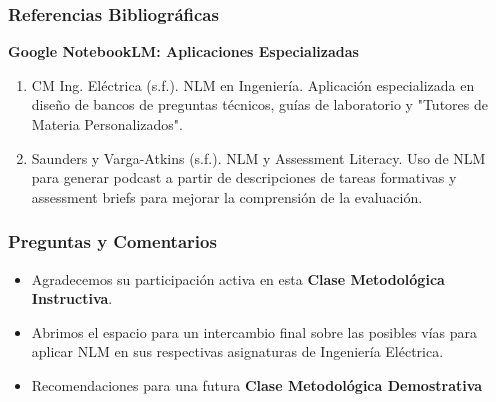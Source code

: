 \documentclass[aspectratio=43]{beamer}
\begin{document}
\begin{frame}
  \frametitle{ Referencias Bibliográficas}
  
  \textbf{Google NotebookLM: Aplicaciones Especializadas}
  \begin{enumerate}
      \item CM Ing. Eléctrica (s.f.). NLM en Ingeniería. Aplicación especializada en diseño de bancos de preguntas técnicos, guías de laboratorio y "Tutores de Materia Personalizados".
      \item Saunders y Varga-Atkins (s.f.). NLM y Assessment Literacy. Uso de NLM para generar podcast a partir de descripciones de tareas formativas y assessment briefs para mejorar la comprensión de la evaluación.
  \end{enumerate}
\end{frame}

\begin{frame}
\frametitle{ Preguntas y Comentarios }
\begin{itemize}
    \item Agradecemos su participación activa en esta \textbf{Clase Metodológica Instructiva}.
    \item Abrimos el espacio para un intercambio final sobre las posibles vías para aplicar NLM en sus respectivas asignaturas de Ingeniería Eléctrica.
    \item Recomendaciones para una futura \textbf{Clase Metodológica Demostrativa}
\end{itemize}
\end{frame}
\end{document}
